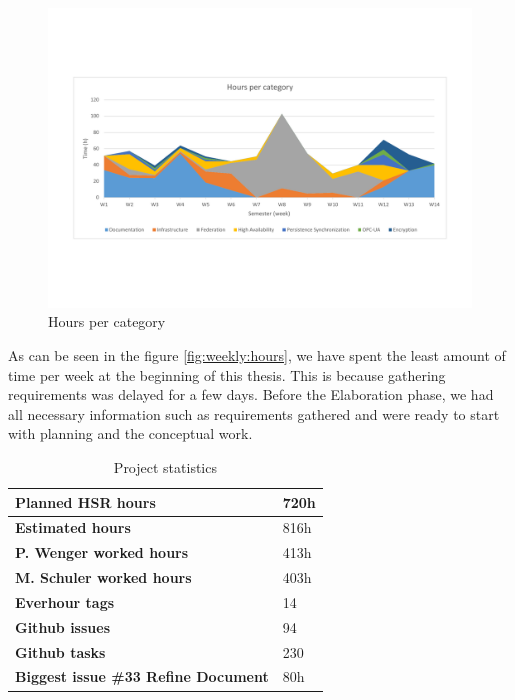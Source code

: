 \begin{figure}[]
	\includegraphics[trim=2cm 5cm 2cm 5.9cm, clip=true, width=\textwidth]{img/project_monitoring_weekly_hours_per_category.pdf}
	\caption{Hours per category}
	\label{fig:hours:per:category}
\end{figure}

As can be seen in the figure \autoref{fig:weekly:hours}, we have spent the
least amount of time per week at the beginning of this thesis. This is because
gathering requirements was delayed for a few days. Before the Elaboration
phase, we had all necessary information such as requirements gathered and were
ready to start with planning and the conceptual work.


\begin{table}[H]
  \centering
  \begin{tabular}{|p{100mm}|p{35mm}|}
    \hline 	\bf Planned HSR hours & 720h \\ \hline
	\bf Estimated hours & 816h \\ \hline
	\bf P. Wenger worked hours & 413h \\ \hline
	\bf M. Schuler worked hours & 403h \\ \hline
	\bf Everhour tags & 14 \\ \hline
	\bf Github issues & 94 \\ \hline
	\bf Github tasks & 230 \\ \hline
	\bf Biggest issue \#33 Refine Document & 80h \\ \hline
  \end{tabular} \\
  \caption{Project statistics}
  \label{tab:projectstats}
\end{table}


